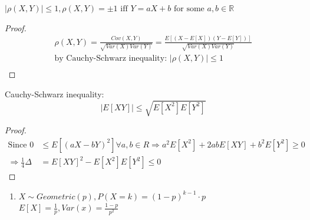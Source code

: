 \begin{lemma}[]{}
$|\rho(X,Y)|\leq 1,\rho(X,Y)=\pm 1\text{ iff }Y=aX+b \text{ for some }a,b \in \mathbb{R}$
\end{lemma}
\begin{proof}
    \begin{align*}{}{}
        \rho(X,Y)=\frac{Cov(X,Y)}{\sqrt{Var(X)Var(Y)}}=\frac{E[(X-E[X])(Y-E[Y])]}{\sqrt{Var(X)Var(Y)}}\\
        \text{by Cauchy-Schwarz inequality: } |\rho(X,Y)|\leq 1\\
    \end{align*}
\end{proof}
Cauchy-Schwarz inequality: $$
    |E[XY]|\leq \sqrt{E[X^2]E[Y^2]}
$$
\begin{proof}
    \begin{align*}{}{}
    \text{Since }0&\leq E[(aX-bY)^2]\forall a,b \in R \Rightarrow a^2E[X^2]+2abE[XY]+b^2E[Y^2]\geq0\\
    \Rightarrow \frac{1}{4}\Delta&=E[XY]^2-E[X^2]E[Y^2]\leq 0
    \end{align*}
\end{proof}
\begin{example}[]{}
 \begin{enumerate}[label=\circled{\arabic*}] 
 \item $ X\sim Geometric(p),P(X=k)=(1-p)^{k-1}\cdot p $\\
 $ E[X]=\frac{1}{p},Var(x)=\frac{1-p}{p^2} $ 
 \end{enumerate}
\end{example}